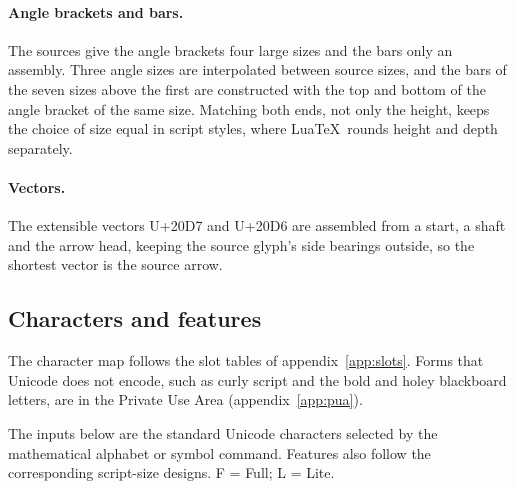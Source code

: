 \documentclass[10pt]{article}
\newcommand\U[1]{U+#1}
\begin{document}
\paragraph{Angle brackets and bars.} The sources give the angle brackets
four large sizes and the bars only an assembly.  Three angle sizes are
interpolated between source sizes, and the bars of the seven sizes above
the first are constructed with the top and bottom of the angle bracket
of the same size.  Matching both ends, not only the height, keeps the
choice of size equal in script styles, where Lua\TeX\ rounds height and
depth separately.

\paragraph{Vectors.} The extensible vectors \U{20D7} and \U{20D6} are
assembled from a start, a shaft and the arrow head, keeping the source
glyph's side bearings outside, so the shortest vector is the source
arrow.

\subsection{Characters and features}

The character map follows the slot tables of appendix~\ref{app:slots}.
Forms that Unicode does not encode, such as curly script and the bold
and holey blackboard letters, are in the Private Use Area
(appendix~\ref{app:pua}).

The inputs below are the standard Unicode characters selected by the
mathematical alphabet or symbol command. Features also follow the
corresponding script-size designs. F = Full; L = Lite.
\end{document}
